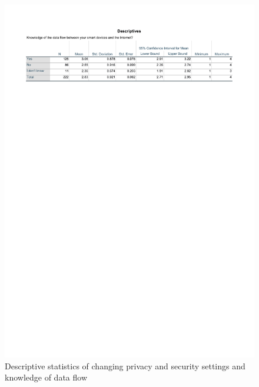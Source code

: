 \begin{figure}[!h]
    \centering
    \includegraphics[scale=0.7]{figures/tables/anova_changesettings_dataflow_desc.pdf}
    \caption{Descriptive statistics of changing privacy and security settings and knowledge of data flow}
    \label{fig:anova_changesettings_dataflow_desc}
\end{figure}

